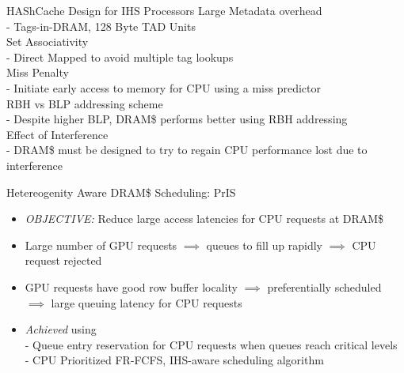 \documentclass[final,t]{beamer}
\newcommand*\circled[1]{\tikz[baseline=(char.base)]{
            \node[shape=circle,draw,inner sep=2pt] (char) {#1};}}
\begin{document}
\begin{frame}[t,fragile]{}
\begin{columns}[t]
\begin{column}{.47\linewidth}
    \begin{exampleblock}{HAShCache Design for IHS Processors}
        \quad Large Metadata overhead \\
        	\quad \qquad- Tags-in-DRAM, 128 Byte TAD Units \\
        \quad Set Associativity \\
        	\quad \qquad- Direct Mapped to avoid multiple tag lookups \\
        \quad Miss Penalty \\
        	\quad \qquad- Initiate early access to memory for CPU using a miss predictor \\
        \quad RBH vs BLP addressing scheme \\
	        \quad \qquad- Despite higher BLP, DRAM\$ performs better using RBH addressing\\
        \quad Effect of Interference \\
        	\quad \qquad- DRAM\$ must be designed to try to regain CPU performance lost due to interference\\
    \end{exampleblock}

    \begin{exampleblock}{ \circled{1} Hetereogenity Aware DRAM\$ Scheduling: PrIS}
    \begin{itemize}
    	\item \emph{OBJECTIVE:} Reduce large access latencies for CPU requests at DRAM\$
    	\item Large number of GPU requests $\implies$ queues to fill up rapidly $\implies$ CPU request rejected
    	\item GPU requests have good row buffer locality $\implies$ preferentially scheduled $\implies$ large queuing latency for CPU requests
    	\item \emph{Achieved} using \\
    	\qquad - Queue entry reservation for CPU requests when queues reach critical levels \\
    	\qquad - CPU Prioritized FR-FCFS, IHS-aware scheduling algorithm
    \end{itemize} 
	\end{exampleblock}
	    

\end{column}
\end{columns}
\end{frame}
\end{document}
